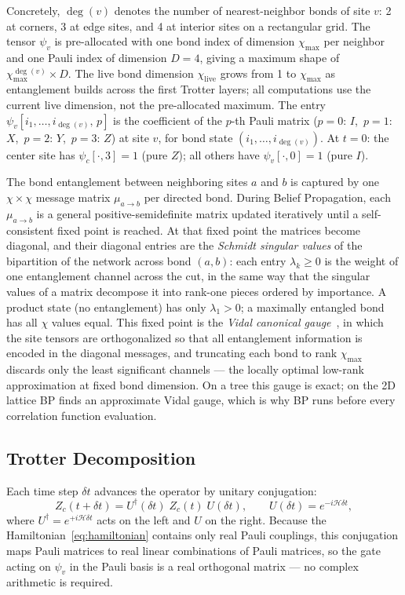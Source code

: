 \documentclass[11pt]{article}
\newcommand{\chimax}{\chi_{\mathrm{max}}}
\newcommand{\ham}{\mathcal{H}}
\begin{document}
Concretely, $\deg(v)$ denotes the number of nearest-neighbor bonds of site $v$:
2 at corners, 3 at edge sites, and 4 at interior sites on a rectangular grid.
The tensor $\psi_v$ is pre-allocated with one bond index of dimension $\chimax$
per neighbor and one Pauli index of dimension $D=4$, giving a maximum shape of
$\chimax^{\deg(v)} \times D$. The live bond dimension $\chi_{\mathrm{live}}$
grows from 1 to $\chimax$ as entanglement builds across the first Trotter layers;
all computations use the current live dimension, not the pre-allocated maximum.
The entry $\psi_v[i_1, \ldots, i_{\deg(v)},\, p]$ is the coefficient of the
$p$-th Pauli matrix ($p{=}0$: $I$,\ $p{=}1$: $X$,\ $p{=}2$: $Y$,\ $p{=}3$: $Z$)
at site $v$, for bond state $(i_1,\ldots,i_{\deg(v)})$.
At $t=0$: the center site has $\psi_c[\cdot,3]=1$ (pure $Z$); all others have
$\psi_v[\cdot,0]=1$ (pure $I$).

The bond entanglement between neighboring sites $a$ and $b$ is captured by one
$\chi \times \chi$ message matrix $\mu_{a \to b}$ per directed bond.
During Belief Propagation, each $\mu_{a \to b}$ is a general
positive-semidefinite matrix updated iteratively until a self-consistent
fixed point is reached.
At that fixed point the matrices become diagonal, and their diagonal entries
are the \emph{Schmidt singular values} of the bipartition of the network
across bond $(a,b)$: each entry $\lambda_k \geq 0$ is the weight of one
entanglement channel across the cut, in the same way that the singular values
of a matrix decompose it into rank-one pieces ordered by importance.
A product state (no entanglement) has only $\lambda_1 > 0$; a maximally
entangled bond has all $\chi$ values equal.
This fixed point is the \emph{Vidal canonical gauge}~\citep{vidal2004efficient},
in which the site tensors are orthogonalized so that all entanglement
information is encoded in the diagonal messages, and truncating each bond to
rank $\chimax$ discards only the least significant channels — the locally
optimal low-rank approximation at fixed bond dimension.
On a tree this gauge is exact; on the 2D lattice BP finds an approximate
Vidal gauge, which is why BP runs before every correlation function evaluation.

\subsection{Trotter Decomposition}

Each time step $\delta t$ advances the operator by unitary conjugation:
\begin{equation}
  Z_c(t+\delta t) = U^\dagger(\delta t)\; Z_c(t)\; U(\delta t),
  \qquad U(\delta t) = e^{-i\ham\delta t},
  \label{eq:heisenberg_step}
\end{equation}
where $U^\dagger = e^{+i\ham\delta t}$ acts on the left and $U$ on the right.
Because the Hamiltonian~\eqref{eq:hamiltonian} contains only real Pauli couplings,
this conjugation maps Pauli matrices to real linear combinations of Pauli matrices,
so the gate acting on $\psi_v$ in the Pauli basis is a real orthogonal matrix —
no complex arithmetic is required.
\end{document}
